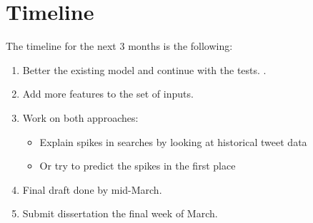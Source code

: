 \documentclass[minf,frontabs,twoside,singlespacing,parskip]{infthesis} %
\begin{document}
\chapter{Timeline}

The timeline for the next 3 months is the following:
\begin{enumerate}
\item Better the existing model and continue with the tests. .
\item Add more features to the set of inputs.
\item Work on both approaches:
\begin{itemize}
\item Explain spikes in searches by looking at historical tweet data
\item Or try to predict the spikes in the first place
\end{itemize}
\item Final draft done by mid-March.
\item Submit dissertation the final week of March.
\end{enumerate}



\end{document}
